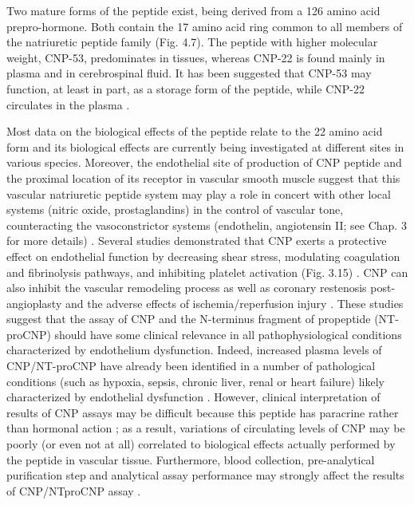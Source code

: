 \documentclass[14pt,a4paper,onecolumn]{extarticle}
\begin{document}
Two mature forms of the peptide exist, being derived from a 126 amino acid prepro-hormone. Both contain the 17 amino acid ring common to all members of the natriuretic peptide family (Fig. 4.7). The peptide with higher molecular weight, CNP-53, predominates in tissues, whereas CNP-22 is found mainly in plasma and in cerebrospinal
fluid. It has been suggested that CNP-53 may function, at least in part, as a storage form
of the peptide, while CNP-22 circulates in the plasma \citep{bib2106} \citep{bib2108} \citep{bib2111} \citep{bib2112} \citep{bib2113}.

Most data on the biological effects of the peptide relate to the 22 amino acid form and
its biological effects are currently being investigated at different sites in various species.
Moreover, the endothelial site of production of CNP peptide and the proximal location
of its receptor in vascular smooth muscle suggest that this vascular natriuretic peptide
system may play a role in concert with other local systems (nitric oxide, prostaglandins)
in the control of vascular tone, counteracting the vasoconstrictor systems (endothelin,
angiotensin II; see Chap. 3 for more details) \citep{bib2107} \citep{bib2114} \citep{bib2115}. Several studies demonstrated that CNP exerts a protective effect on endothelial function by decreasing shear
stress, modulating coagulation and fibrinolysis pathways, and inhibiting platelet activation (Fig. 3.15) \citep{bib2114} \citep{bib2115}. CNP can also inhibit the vascular remodeling process as well
as coronary restenosis post-angioplasty and the adverse effects of ischemia/reperfusion injury \citep{bib2107} \citep{bib2113} \citep{bib2114} \citep{bib2115} \citep{bib2116} \citep{bib2117} \citep{bib2118} \citep{bib2119} \citep{bib2120}.
These studies suggest that the assay of CNP and the N-terminus fragment of propeptide (NT-proCNP) should have some clinical relevance in all pathophysiological
conditions characterized by endothelium dysfunction. Indeed, increased plasma levels of CNP/NT-proCNP have already been identified in a number of pathological conditions (such as hypoxia, sepsis, chronic liver, renal or heart failure) likely characterized by endothelial dysfunction \citep{bib2106} \citep{bib2114} \citep{bib2121} \citep{bib2122} \citep{bib2123} \citep{bib2124} \citep{bib2125} \citep{bib2126} \citep{bib2127} \citep{bib2128} \citep{bib2129}. However, clinical interpretation
of results of CNP assays may be difficult because this peptide has paracrine rather
than hormonal action \citep{bib2112} \citep{bib2113} \citep{bib2114} \citep{bib2115}; as a result, variations of circulating levels of CNP
may be poorly (or even not at all) correlated to biological effects actually performed
by the peptide in vascular tissue. Furthermore, blood collection, pre-analytical purification step and analytical assay performance may strongly affect the results of CNP/NTproCNP assay \citep{bib298}.
\end{document}
